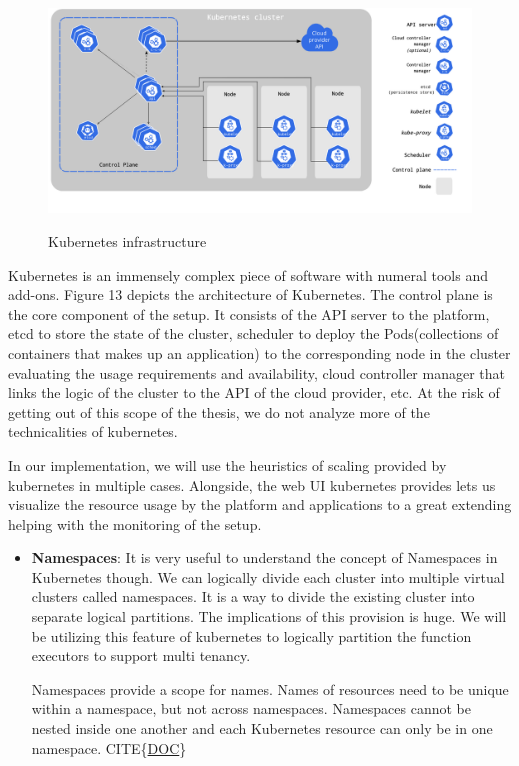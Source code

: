 \documentclass[12pt,titlepage]{article}
\begin{document}
\begin{figure}[!h]
    \caption{Kubernetes infrastructure}
    \centering
    \includegraphics[width=180mm]{./thesis_images/k8s.png}
    \label{fig:k8s}
\end{figure}

Kubernetes is an immensely complex piece of software with numeral tools and
add-ons. Figure 13 depicts the architecture of Kubernetes. The control plane is
the core component of the setup. It consists of the API server to the platform,
etcd to store the state of the cluster, scheduler to deploy the Pods(collections
of containers that makes up an application) to the corresponding node in the
cluster evaluating the usage requirements and availability, cloud controller
manager that links the logic of the cluster to the API of the cloud provider,
etc. At the risk of getting out of this scope of the thesis, we do not analyze
more of the technicalities of kubernetes.

In our implementation, we will use the heuristics of scaling provided by
kubernetes in multiple cases. Alongside, the web UI kubernetes provides lets us
visualize the resource usage by the platform and applications to a great
extending helping with the monitoring of the setup.

\begin{itemize}
\item \textbf{Namespaces}: It is very useful to understand the concept of Namespaces in Kubernetes though.
We can logically divide each cluster into multiple virtual clusters called
namespaces. It is a way to divide the existing cluster into separate logical
partitions. The implications of this provision is huge. We will be utilizing
this feature of kubernetes to logically partition the function executors to
support multi tenancy. 

Namespaces provide a scope for names. Names of resources need to be unique
within a namespace, but not across namespaces. Namespaces cannot be nested
inside one another and each Kubernetes resource can only be in one namespace. CITE\{\href{https://kubernetes.io/docs/concepts/overview/working-with-objects/namespaces/}{DOC}\}
\end{itemize}
\end{document}
